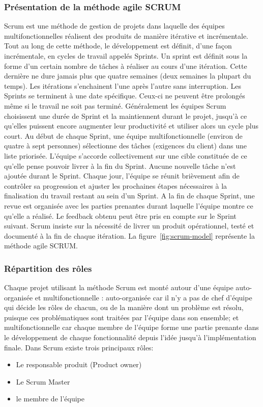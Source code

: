 \subsubsection{Présentation de la méthode agile SCRUM}

Scrum est une méthode de gestion de projets dans laquelle des équipes
multifonctionnelles réalisent des produits de manière itérative et incrémentale.
Tout au long de cette méthode, le développement est définit, d'une façon
incrémentale, en cycles de travail appelés Sprints. Un sprint est définit sous
la forme d'un certain nombre de tâches à réaliser au cours d'une itération.
Cette dernière ne dure jamais plus que quatre semaines (deux semaines la
plupart du temps). Les itérations s'enchainent l'une après l'autre sans
interruption. Les Sprints se terminent à une date spécifique. Ceux-ci ne
peuvent être prolongés même si le travail ne soit pas terminé. Généralement les équipes
Scrum choisissent une durée de Sprint et la maintiennent durant le projet, jusqu'à ce
qu'elles puissent encore augmenter leur productivité et utiliser alors un cycle plus court.
Au début de chaque Sprint, une équipe multifonctionnelle (environ de quatre à sept
personnes) sélectionne des tâches (exigences du client) dans une liste priorisée.
L'équipe s'accorde collectivement sur une cible constituée de ce qu'elle pense pouvoir
livrer à la fin du Sprint. Aucune nouvelle tâche n'est ajoutée durant le Sprint. Chaque
jour, l'équipe se réunit brièvement afin de contrôler sa progression et ajuster les
prochaines étapes nécessaires à la finalisation du travail restant au sein d'un Sprint. A la
fin de chaque Sprint, une revue est organisée avec les parties prenantes durant laquelle
l'équipe montre ce qu'elle a réalisé. Le feedback obtenu peut être pris en compte sur le
Sprint suivant.
Scrum insiste sur la nécessité de livrer un produit opérationnel, testé et
documenté à la fin de chaque itération.
La figure~\ref{fig:scrum-model} représente la méthode agile SCRUM. 



\subsubsection{Répartition des rôles}

Chaque projet utilisant la méthode Scrum est monté autour d'une équipe auto-
organisée et multifonctionnelle : auto-organisée car il n'y a pas de chef d'équipe qui
décide les rôles de chacun, ou de la manière dont un problème est résolu, puisque ces
problématiques sont traitées par l'équipe dans son ensemble; et multifonctionnelle car
chaque membre de l'équipe forme une partie prenante dans le développement de
chaque fonctionnalité depuis l'idée jusqu'à l'implémentation finale.
Dans Scrum existe trois principaux rôles:
\begin{itemize}
 \item Le responsable produit (Product owner)
 \item Le Scrum Master
 \item le membre de l'équipe
\end{itemize}

